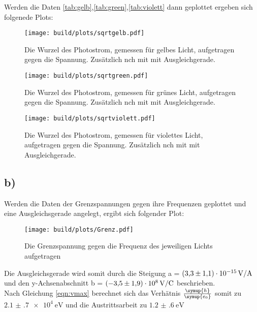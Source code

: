     \noindent
    Werden die Daten \ref{tab:gelb},\ref{tab:green},\ref{tab:violett} dann geplottet ergeben sich folgenede Plots:
    \noindent

    \begin{figure}[H]
        \centering
        \texttt{[image: build/plots/sqrtgelb.pdf]}
        \caption{Die Wurzel des Photostrom, gemessen für gelbes Licht, aufgetragen gegen die Spannung. Zusätzlich nch mit mit Ausgleichgerade.}
        \label{img:sqrtgelb}
    \end{figure}

    \begin{figure}[H]
        \centering
        \texttt{[image: build/plots/sqrtgreen.pdf]}
        \caption{Die Wurzel des Photostrom, gemessen für grünes Licht, aufgetragen gegen die Spannung. Zusätzlich nch mit mit Ausgleichgerade.}
        \label{img:sqrtgruen}
    \end{figure}

    \begin{figure}[H]
        \centering
        \texttt{[image: build/plots/sqrtviolett.pdf]}
        \caption{Die Wurzel des Photostrom, gemessen für violettes Licht, aufgetragen gegen die Spannung. Zusätzlich nch mit mit Ausgleichgerade.}
        \label{img:sqrtviolett}
    \end{figure}
\newpage
\subsection{b)}

    \noindent
    Werden die Daten der Grenzspannungen gegen ihre Frequenzen geplottet und eine Ausgleichsgerade angelegt, ergibt sich folgender Plot:
    \noindent

    \begin{figure}[H]
        \centering
        \texttt{[image: build/plots/Grenz.pdf]}
        \caption{Die Grenzspannung gegen die Frequenz des jeweiligen Lichts aufgetragen}
        \label{img:gegen}
    \end{figure}


    \noindent
    Die Ausgleichsgerade wird somit durch die Steigung a = $\SI{3.3 (11)e-15}{\volt\per\ampere}$ und den y-Achsenabschnitt 
    b = $\SI{-3.5 (19)e8}{\volt\per\coulomb}$ beschrieben.\\
    Nach Gleichung \ref{eqn:vmax} berechnet sich das Verhätnis $\frac{\symup{h}}{\symup{e_0}}$ somit zu $\SI{2.1(7)e4}{\electronvolt}$ und die 
    Austrittsarbeit zu $\SI{1.2(6)}{\electronvolt}$
    \noindent

